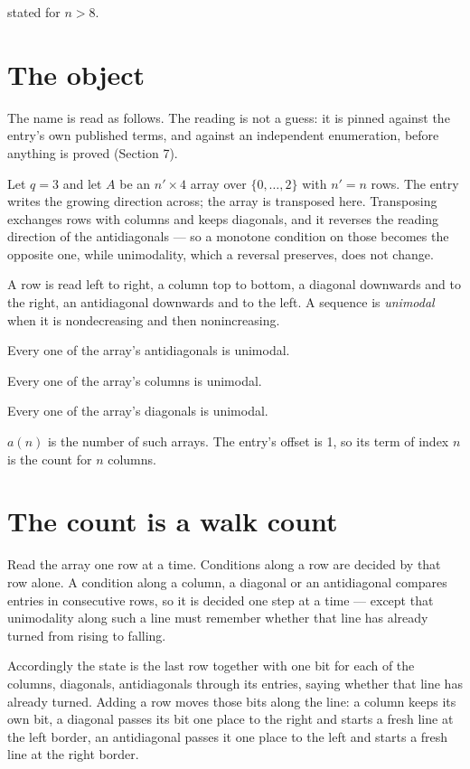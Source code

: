 \documentclass[11pt]{article}
\theoremstyle{definition}
\begin{document}
stated for $n > 8$.

\section{The object}

The name is read as follows. The reading is not a guess: it is pinned against the entry's own published terms, and against an independent enumeration, before anything is proved (Section 7).

Let $q = 3$ and let $A$ be an $n' \times 4$ array over $\{0,\dots,2\}$ with $n' = n$ rows. The entry writes the growing direction across; the array is transposed here. Transposing exchanges rows with columns and keeps diagonals, and it reverses the reading direction of the antidiagonals --- so a monotone condition on those becomes the opposite one, while unimodality, which a reversal preserves, does not change.

A row is read left to right, a column top to bottom, a diagonal downwards and to the right, an antidiagonal downwards and to the left. A sequence is {\itshape unimodal} when it is nondecreasing and then nonincreasing.

Every one of the array's antidiagonals is unimodal.

Every one of the array's columns is unimodal.

Every one of the array's diagonals is unimodal.

$a(n)$ is the number of such arrays. The entry's offset is 1, so its term of index $n$ is the count for $n$ columns.

\section{The count is a walk count}

Read the array one row at a time. Conditions along a row are decided by that row alone. A condition along a column, a diagonal or an antidiagonal compares entries in consecutive rows, so it is decided one step at a time --- except that unimodality along such a line must remember whether that line has already turned from rising to falling.

Accordingly the state is the last row together with one bit for each of the columns, diagonals, antidiagonals through its entries, saying whether that line has already turned. Adding a row moves those bits along the line: a column keeps its own bit, a diagonal passes its bit one place to the right and starts a fresh line at the left border, an antidiagonal passes it one place to the left and starts a fresh line at the right border.
\end{document}
